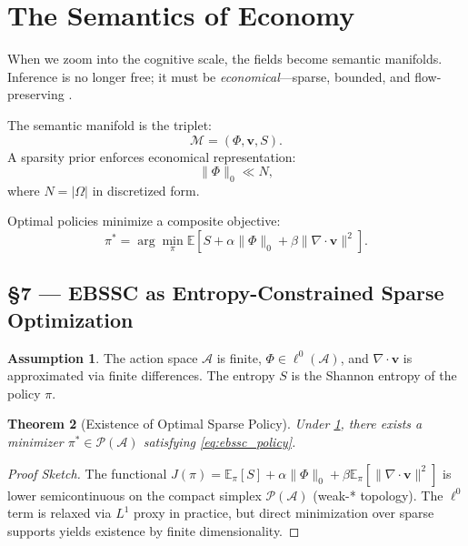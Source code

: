 \documentclass[11pt]{article}
\newtheorem{theorem}{Theorem}[section]
\theoremstyle{definition}
\newtheorem{assumption}[theorem]{Assumption}
\theoremstyle{remark}
\newcommand{\vect}[1]{\bm{#1}}
\begin{document}
\section{The Semantics of Economy}
When we zoom into the cognitive scale, the fields become semantic manifolds. Inference is no longer free; it must be \emph{economical}—sparse, bounded, and flow-preserving \cite{Friston2019}.

The semantic manifold is the triplet:
\begin{equation}
\boxed{\mathcal{M}=(\Phi,\vect{v},S).}
\end{equation}
A sparsity prior enforces economical representation:
\begin{equation}
\boxed{\|\Phi\|_0 \ll N,}
\end{equation}
where $N = |\Omega|$ in discretized form.

Optimal policies minimize a composite objective:
\begin{equation}
\boxed{\pi^*=\arg\min_{\pi}\mathbb{E}\left[S + \alpha\|\Phi\|_0 + \beta\|\nabla\cdot\vect{v}\|^2\right].}
\label{eq:ebssc_policy}
\end{equation}

\subsection*{§7 — EBSSC as Entropy-Constrained Sparse Optimization}

\begin{assumption}
\label{ass:ebssc}
The action space $\mathcal{A}$ is finite, $\Phi \in \ell^0(\mathcal{A})$, and $\nabla \cdot \vect{v}$ is approximated via finite differences. The entropy $S$ is the Shannon entropy of the policy $\pi$.
\end{assumption}

\begin{theorem}[Existence of Optimal Sparse Policy]
Under \cref{ass:ebssc}, there exists a minimizer $\pi^* \in \mathcal{P}(\mathcal{A})$ satisfying \eqref{eq:ebssc_policy}.
\end{theorem}

\begin{proof}[Proof Sketch]
The functional $J(\pi) = \mathbb{E}_\pi[S] + \alpha \|\Phi\|_0 + \beta \mathbb{E}_\pi[\|\nabla \cdot \vect{v}\|^2]$ is lower semicontinuous on the compact simplex $\mathcal{P}(\mathcal{A})$ (weak-* topology). The $\ell^0$ term is relaxed via $L^1$ proxy in practice, but direct minimization over sparse supports yields existence by finite dimensionality.
\end{proof}
\end{document}
